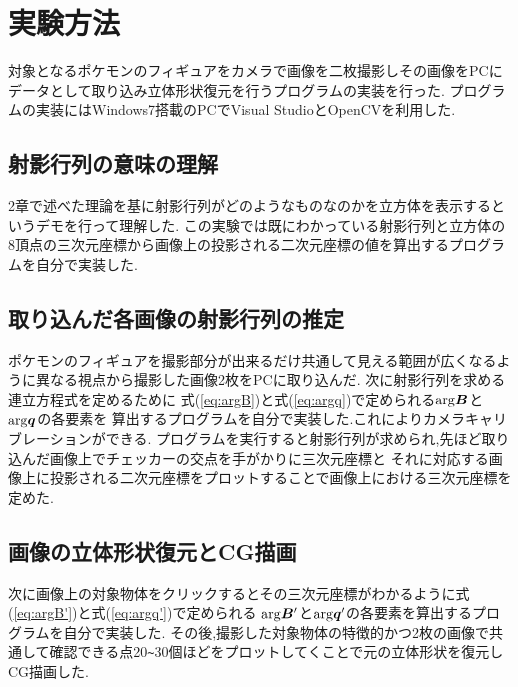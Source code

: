 \documentclass[11pt,a4j]{jsarticle}
\begin{document}
    \section{実験方法}
    対象となるポケモンのフィギュアをカメラで画像を二枚撮影しその画像をPCにデータとして取り込み立体形状復元を行うプログラムの実装を行った.
    プログラムの実装にはWindows7搭載のPCでVisual StudioとOpenCVを利用した.
    \subsection{射影行列の意味の理解}
    2章で述べた理論を基に射影行列がどのようなものなのかを立方体を表示するというデモを行って理解した.
    この実験では既にわかっている射影行列と立方体の8頂点の三次元座標から画像上の投影される二次元座標の値を算出するプログラムを自分で実装した.
    \subsection{取り込んだ各画像の射影行列の推定}
    ポケモンのフィギュアを撮影部分が出来るだけ共通して見える範囲が広くなるように異なる視点から撮影した画像2枚をPCに取り込んだ.
    次に射影行列を求める連立方程式を定めるために
    式(\ref{eq:argB})と式(\ref{eq:argq})で定められる${\rm arg}\bm{B}$と${\rm arg}\bm{q}$の各要素を
    算出するプログラムを自分で実装した.これによりカメラキャリブレーションができる.
    プログラムを実行すると射影行列が求められ,先ほど取り込んだ画像上でチェッカーの交点を手がかりに三次元座標と
    それに対応する画像上に投影される二次元座標をプロットすることで画像上における三次元座標を定めた.
    \subsection{画像の立体形状復元とCG描画}
    次に画像上の対象物体をクリックするとその三次元座標がわかるように式(\ref{eq:argB'})と式(\ref{eq:argq'})で定められる
    ${\rm arg}\bm{B}'$と${\rm arg}\bm{q}'$の各要素を算出するプログラムを自分で実装した.
    その後,撮影した対象物体の特徴的かつ2枚の画像で共通して確認できる点20\verb|~|30個ほどをプロットしてくことで元の立体形状を復元しCG描画した.
\end{document}
